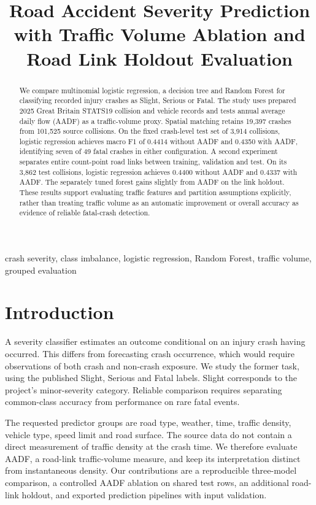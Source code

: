 \documentclass[conference]{IEEEtran}
\title{Road Accident Severity Prediction with Traffic Volume Ablation and Road Link Holdout Evaluation}
\author{\IEEEauthorblockN{Road Accident Severity Prediction Project Team}}
\begin{document}
\maketitle
\begin{abstract}
We compare multinomial logistic regression, a decision tree and Random Forest for classifying recorded injury crashes as Slight, Serious or Fatal. The study uses prepared 2025 Great Britain STATS19 collision and vehicle records and tests annual average daily flow (AADF) as a traffic-volume proxy. Spatial matching retains 19,397 crashes from 101,525 source collisions. On the fixed crash-level test set of 3,914 collisions, logistic regression achieves macro F1 of 0.4414 without AADF and 0.4350 with AADF, identifying seven of 49 fatal crashes in either configuration. A second experiment separates entire count-point road links between training, validation and test. On its 3,862 test collisions, logistic regression achieves 0.4400 without AADF and 0.4337 with AADF. The separately tuned forest gains slightly from AADF on the link holdout. These results support evaluating traffic features and partition assumptions explicitly, rather than treating traffic volume as an automatic improvement or overall accuracy as evidence of reliable fatal-crash detection.
\end{abstract}
\begin{IEEEkeywords}
crash severity, class imbalance, logistic regression, Random Forest, traffic volume, grouped evaluation
\end{IEEEkeywords}

\section{Introduction}
A severity classifier estimates an outcome conditional on an injury crash having occurred. This differs from forecasting crash occurrence, which would require observations of both crash and non-crash exposure. We study the former task, using the published Slight, Serious and Fatal labels. Slight corresponds to the project's minor-severity category. Reliable comparison requires separating common-class accuracy from performance on rare fatal events.

The requested predictor groups are road type, weather, time, traffic density, vehicle type, speed limit and road surface. The source data do not contain a direct measurement of traffic density at the crash time. We therefore evaluate AADF, a road-link traffic-volume measure, and keep its interpretation distinct from instantaneous density. Our contributions are a reproducible three-model comparison, a controlled AADF ablation on shared test rows, an additional road-link holdout, and exported prediction pipelines with input validation.
\end{document}

